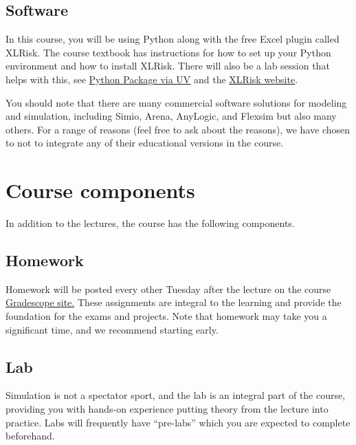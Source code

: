 \documentclass[11pt, a4paper]{article}
\begin{document}
\subsection*{Software}
In this course, you will be using Python along with the free Excel plugin called XLRisk. The course textbook has instructions for how to set up your Python environment and how to install XLRisk. There will also be a lab session that helps with this, see \href{https://github.com/Gabriel-vzh2vs/SYS3062SoftwarePackage}{Python Package via UV} and the \href{https://github.com/pyscripter/XLRisk}{XLRisk website}.

You should note that there are many commercial software solutions for modeling and simulation, including Simio, Arena, AnyLogic, and Flexsim but also many others. For a range of reasons (feel free to ask about the reasons), we have chosen to not to integrate any of their educational versions in the course. 

\section*{Course components}

In addition to the lectures, the course has the following components.

\subsection*{Homework}
Homework will be posted every other Tuesday after the lecture on the course \href{https://www.gradescope.com/courses/1176037}{Gradescope site.} These assignments are integral to the learning and provide the foundation for the exams and projects.  Note that homework may take you a significant time, and we recommend starting early.


\subsection*{Lab}
Simulation is not a spectator sport, and the lab is an integral part of the course, providing you with hands-on experience putting theory from the lecture into practice. Labs will frequently have ``pre-labs'' which you are expected to complete beforehand.
\end{document}
